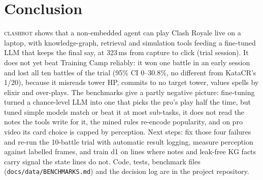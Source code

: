 \documentclass[conference]{IEEEtran}
\newcommand{\cb}{\textsc{clashbot}}
\newcommand{\tw}[1]{\texttt{#1}}
\begin{document}
\section{Conclusion}

\cb{} shows that a non-embedded agent can play Clash Royale live on a laptop, with knowledge-graph, retrieval and simulation tools feeding a fine-tuned LLM that keeps the final say, at 323\,ms from capture to click (trial session). It does not yet beat Training Camp reliably: it won one battle in an early session and lost all ten battles of the trial (95\% CI 0--30.8\%, no different from KataCR's 1/20), because it misreads tower HP, commits to no target tower, values spells by elixir and over-plays. The benchmarks give a partly negative picture: fine-tuning turned a chance-level LLM into one that picks the pro's play half the time, but tuned simple models match or beat it at most sub-tasks, it does not read the notes the tools write for it, the mined rules re-encode popularity, and on pro video its card choice is capped by perception. Next steps: fix those four failures and re-run the 10-battle trial with automatic result logging, measure perception against labelled frames, and train d1 on lines where notes and leak-free KG facts carry signal the state lines do not. Code, tests, benchmark files (\tw{docs/data/BENCHMARKS.md}) and the decision log are in the project repository. %



\end{document}
